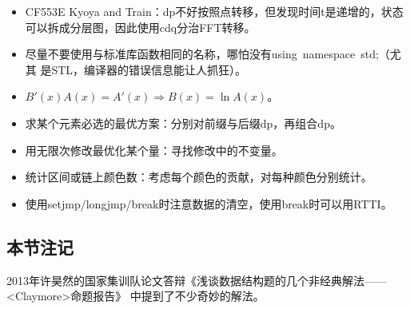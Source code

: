 \begin{itemize}
	\item CF553E Kyoya and Train：dp不好按照点转移，但发现时间t是递增的，状态
	可以拆成分层图，因此使用cdq分治FFT转移。
	\item 尽量不要使用与标准库函数相同的名称，哪怕没有using~namespace~std;（尤其
	是STL，编译器的错误信息能让人抓狂）。
	\item $B'(x)A(x)=A'(x)\Rightarrow B(x)=\ln A(x)$。
	\item 求某个元素必选的最优方案：分别对前缀与后缀dp，再组合dp。
	\item 用无限次修改最优化某个量：寻找修改中的不变量。
	\item 统计区间或链上颜色数：考虑每个颜色的贡献，对每种颜色分别统计。
	\item 使用setjmp/longjmp/break时注意数据的清空，使用break时可以用RTTI。
\end{itemize}
\subsection{本节注记}
2013年许昊然的国家集训队论文答辩《浅谈数据结构题的几个非经典解法——<Claymore>命题报告》
中提到了不少奇妙的解法。
